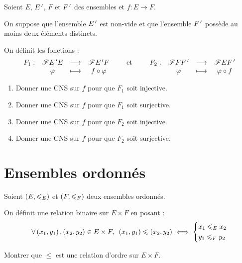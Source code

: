 \begin{exo}[Exercice 14]
Soient \(E\), \(E^{\,\prime}\), \(F\) et \(F^{\,\prime}\) des ensembles et \(f:E\to F\).

On suppose que l'ensemble \(E^{\,\prime}\) est non-vide et que l'ensemble \(F^{\,\prime}\) possède au moins deux éléments distincts.

On définit les fonctions : \[\begin{array}[t]{cccc}F_1 : & \mathscr{F}{E^{\,\prime}}{E} & \longrightarrow & \mathscr{F}{E^{\,\prime}}{F} \\ & \varphi & \longmapsto & f\circ\varphi\end{array}\qquad\text{et}\qquad\begin{array}[t]{cccc}F_2 : & \mathscr{F}{F}{F^{\,\prime}} & \longrightarrow & \mathscr{F}{E}{F^{\,\prime}} \\ & \varphi & \longmapsto & \varphi\circ f\end{array}\]

\begin{enumerate}
\item Donner une CNS sur \(f\) pour que \(F_1\) soit injective. \\

\item Donner une CNS sur \(f\) pour que \(F_1\) soit surjective. \\

\item Donner une CNS sur \(f\) pour que \(F_2\) soit injective. \\

\item Donner une CNS sur \(f\) pour que \(F_2\) soit surjective.
\end{enumerate}
\end{exo}

\begin{corr}
\end{corr}

\section{Ensembles ordonnés}

\begin{exo}
Soient \(\groupe{E}[\leq_E]\) et \(\groupe{F}[\leq_F]\) deux ensembles ordonnés.

On définit une relation binaire sur \(E\times F\) en posant : \[\quantifs{\forall\paren{x_1,y_1},\paren{x_2,y_2}\in E\times F}\paren{x_1,y_1}\leq\paren{x_2,y_2}\ssi\begin{dcases}x_1\leq_Ex_2 \\ y_1\leq_Fy_2\end{dcases}\]

Montrer que \(\leq\) est une relation d'ordre sur \(E\times F\).
\end{exo}

\begin{corr}
\end{corr}

